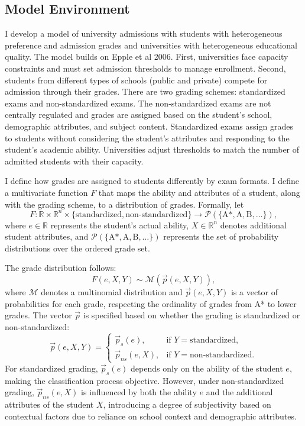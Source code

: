 \subsection{Model Environment}

I develop a model of university admissions with students with heterogeneous preference and admission grades and universities with heterogeneous educational quality. The model builds on Epple et al 2006. First, universities face capacity constraints and must set admission thresholds to manage enrollment. Second, students from different types of schools (public and private) compete for admission through their grades. There are two grading schemes: standardized exams and non-standardized exams. The non-standardized exams are not centrally regulated and grades are assigned based on the student's school, demographic attributes, and subject content. Standardized exams assign grades to students without considering the student's attributes and responding to the student's academic ability. Universities adjust thresholds to match the number of admitted students with their capacity. 

I define how grades are assigned to students differently by exam formats. I define a multivariate function \( F \) that maps the ability and attributes of a student, along with the grading scheme, to a distribution of grades. Formally, let
\[
F: \mathbb{R} \times \mathbb{R}^n \times \{ \text{standardized}, \text{non-standardized} \} \to \mathcal{P}(\{\text{A*}, \text{A}, \text{B}, \ldots\}),
\]
where \( e \in \mathbb{R} \) represents the student's actual ability, \( X \in \mathbb{R}^n \) denotes additional student attributes, and \( \mathcal{P}(\{\text{A*}, \text{A}, \text{B}, \ldots\}) \) represents the set of probability distributions over the ordered grade set.

The grade distribution follows:
\[
F(e, X, Y) \sim \mathcal{M}(\vec{p}(e, X, Y)),
\]
where \( \mathcal{M} \) denotes a multinomial distribution and \( \vec{p}(e, X, Y) \) is a vector of probabilities for each grade, respecting the ordinality of grades from A* to lower grades. The vector \( \vec{p} \) is specified based on whether the grading is standardized or non-standardized:
\[
\vec{p}(e, X, Y) =
\begin{cases}
\vec{p}_s(e), & \text{if } Y = \text{standardized}, \\
\vec{p}_{ns}(e, X), & \text{if } Y = \text{non-standardized}.
\end{cases}
\]
For standardized grading, \( \vec{p}_s(e) \) depends only on the ability of the student \( e \), making the classification process objective. However, under non-standardized grading, \( \vec{p}_{ns}(e, X) \) is influenced by both the ability \( e \) and the additional attributes of the student \( X \), introducing a degree of subjectivity based on contextual factors due to reliance on school context and demographic attributes.

